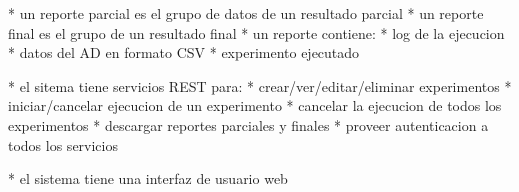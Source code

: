 * un reporte parcial es el grupo de datos de un resultado parcial
* un reporte final es el grupo de un resultado final
* un reporte contiene:
    * log de la ejecucion
    * datos del AD en formato CSV
    * experimento ejecutado

* el sitema tiene servicios REST para:
    * crear/ver/editar/eliminar experimentos
    * iniciar/cancelar ejecucion de un experimento
    * cancelar la ejecucion de todos los experimentos
    * descargar reportes parciales y finales
    * proveer autenticacion a todos los servicios

* el sistema tiene una interfaz de usuario web